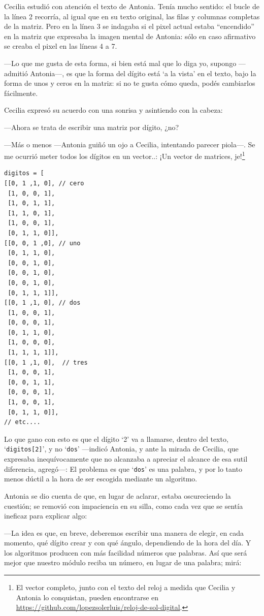 Cecilia estudió con atención el texto de Antonia. Tenía mucho sentido:
el bucle de la línea 2 recorría, al igual que en su texto original,
las filas y columnas completas de la matriz. Pero en la línea 3 se
indagaba si el pixel actual estaba ``encendido'' en la matriz que
expresaba la imagen mental de Antonia: sólo en caso afirmativo se
creaba el pixel en las líneas 4 a 7.

---Lo que me gusta de esta forma, si bien está mal que lo diga yo,
supongo ---admitió Antonia---, es que la forma del dígito está `a la
vista' en el texto, bajo la forma de unos y ceros en la matriz: si no
te gusta cómo queda, podés cambiarlos fácilmente.

Cecilia expresó su acuerdo con una sonrisa y asintiendo con la
cabeza:

---Ahora se trata de escribir una matriz por dígito, ¿no?

---Más o menos ---Antonia guiñó un ojo a Cecilia, intentando parecer
piola---. Se me ocurrió meter todos los dígitos en un vector..: ¡Un
vector de matrices, je!\footnote{El vector completo, junto con el
  texto del reloj a medida que Cecilia y Antonia lo conquistan, pueden
  encontrarse en
  \url{https://github.com/lopezsolerluis/reloj-de-sol-digital}.}


\begin{lstlisting}
digitos = [
[[0, 1 ,1, 0], // cero
 [1, 0, 0, 1],
 [1, 0, 1, 1],
 [1, 1, 0, 1],
 [1, 0, 0, 1],
 [0, 1, 1, 0]],
[[0, 0, 1 ,0], // uno
 [0, 1, 1, 0],
 [0, 0, 1, 0],
 [0, 0, 1, 0],
 [0, 0, 1, 0],
 [0, 1, 1, 1]],
[[0, 1 ,1, 0], // dos
 [1, 0, 0, 1],
 [0, 0, 0, 1],
 [0, 1, 1, 0],
 [1, 0, 0, 0],
 [1, 1, 1, 1]],
[[0, 1 ,1, 0],  // tres
 [1, 0, 0, 1],
 [0, 0, 1, 1],
 [0, 0, 0, 1],
 [1, 0, 0, 1],
 [0, 1, 1, 0]],
// etc....
\end{lstlisting}

\guillemotright Lo que gano con esto es que el dígito `2' va a
llamarse, dentro del texto, `\lstinline!digitos[2]!', y no
`\lstinline!dos!'  ---indicó Antonia, y ante la mirada de Cecilia, que
expresaba inequívocamente que no alcanzaba a apreciar el alcance de
esa sutil diferencia, agregó---: El problema es que `\lstinline!dos!'
es una palabra, y por lo tanto menos dúctil a la hora de ser escogida
mediante un algoritmo.

Antonia se dio cuenta de que, en lugar de aclarar, estaba oscureciendo
la cuestión; se removió con impaciencia en su silla, como cada vez que
se sentía ineficaz para explicar algo:

---La idea es que, en breve, deberemos escribir una manera de elegir,
en cada momento, qué dígito crear y con qué ángulo, dependiendo de la
hora del día. Y los algoritmos producen con más facilidad números que
palabras. Así que será mejor que nuestro módulo reciba un número, en
lugar de una palabra; mirá:

